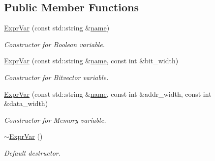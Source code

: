 \subsection*{Public Member Functions}
\begin{DoxyCompactItemize}
\item 
\mbox{\label{classilang_1_1_expr_var_a51b883dcec1ad1d97a175436591b8f7b}} 
\mbox{\hyperlink{classilang_1_1_expr_var_a51b883dcec1ad1d97a175436591b8f7b}{Expr\+Var}} (const std\+::string \&\mbox{\hyperlink{classilang_1_1_object_acf20b072e69f572910d7d80c93af0b38}{name}})
\begin{DoxyCompactList}\small\item\em Constructor for Boolean variable. \end{DoxyCompactList}\item 
\mbox{\label{classilang_1_1_expr_var_ad1c8cb733c7182f66caa94514b690611}} 
\mbox{\hyperlink{classilang_1_1_expr_var_ad1c8cb733c7182f66caa94514b690611}{Expr\+Var}} (const std\+::string \&\mbox{\hyperlink{classilang_1_1_object_acf20b072e69f572910d7d80c93af0b38}{name}}, const int \&bit\+\_\+width)
\begin{DoxyCompactList}\small\item\em Constructor for Bitvector variable. \end{DoxyCompactList}\item 
\mbox{\label{classilang_1_1_expr_var_a132f0c6aac806b8d279734d0ce1307a7}} 
\mbox{\hyperlink{classilang_1_1_expr_var_a132f0c6aac806b8d279734d0ce1307a7}{Expr\+Var}} (const std\+::string \&\mbox{\hyperlink{classilang_1_1_object_acf20b072e69f572910d7d80c93af0b38}{name}}, const int \&addr\+\_\+width, const int \&data\+\_\+width)
\begin{DoxyCompactList}\small\item\em Constructor for Memory variable. \end{DoxyCompactList}\item 
\mbox{\label{classilang_1_1_expr_var_ae1875995f6213b1ff2084ac95c48368a}} 
\mbox{\hyperlink{classilang_1_1_expr_var_ae1875995f6213b1ff2084ac95c48368a}{$\sim$\+Expr\+Var}} ()
\begin{DoxyCompactList}\small\item\em Default destructor. \end{DoxyCompactList}\item 

\end{DoxyCompactItemize}
